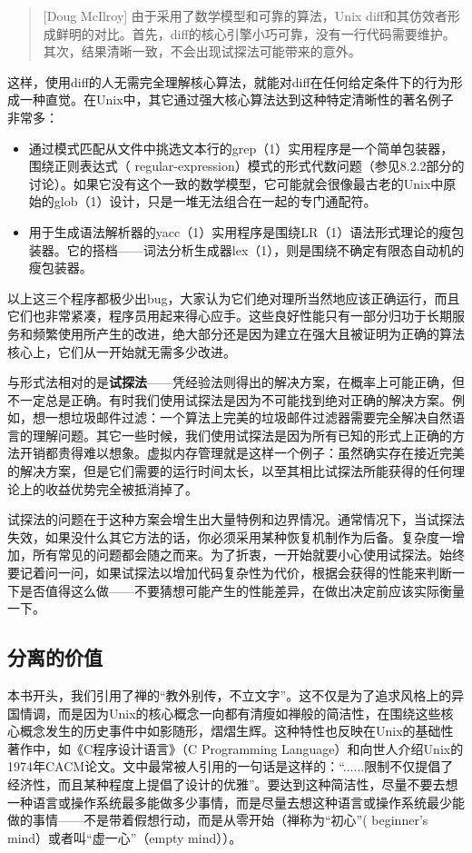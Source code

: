 \documentclass[12pt,oneside]{book}
\begin{document}
\begin{common-format}
\begin{quote}[Doug McIlroy]
由于采用了数学模型和可靠的算法，Unix diff和其仿效者形成鲜明的对比。首先，diff的核心引擎小巧可靠，没有一行代码需要维护。其次，结果清晰一致，不会出现试探法可能带来的意外。
\end{quote}

这样，使用diff的人无需完全理解核心算法，就能对diff在任何给定条件下的行为形成一种直觉。在Unix中，其它通过强大核心算法达到这种特定清晰性的著名例子非常多：

\begin{itemize}
\item 通过模式匹配从文件中挑选文本行的grep（1）实用程序是一个简单包装器，围绕正则表达式（ regular-expression）模式的形式代数问题（参见8.2.2部分的讨论）。如果它没有这个一致的数学模型，它可能就会很像最古老的Unix中原始的glob（1）设计，只是一堆无法组合在一起的专门通配符。
\item 用于生成语法解析器的yacc（1）实用程序是围绕LR（1）语法形式理论的瘦包装器。它的搭档——词法分析生成器lex（1），则是围绕不确定有限态自动机的瘦包装器。
\end{itemize}

以上这三个程序都极少出bug，大家认为它们绝对理所当然地应该正确运行，而且它们也非常紧凑，程序员用起来得心应手。这些良好性能只有一部分归功于长期服务和频繁使用所产生的改进，绝大部分还是因为建立在强大且被证明为正确的算法核心上，它们从一开始就无需多少改进。

与形式法相对的是\textbf{试探法}——凭经验法则得出的解决方案，在概率上可能正确，但不一定总是正确。有时我们使用试探法是因为不可能找到绝对正确的解决方案。例如，想一想垃圾邮件过滤：一个算法上完美的垃圾邮件过滤器需要完全解决自然语言的理解问题。其它一些时候，我们使用试探法是因为所有已知的形式上正确的方法开销都贵得难以想象。虚拟内存管理就是这样一个例子：虽然确实存在接近完美的解决方案，但是它们需要的运行时间太长，以至其相比试探法所能获得的任何理论上的收益优势完全被抵消掉了。

试探法的问题在于这种方案会增生出大量特例和边界情况。通常情况下，当试探法失效，如果没什么其它方法的话，你必须采用某种恢复机制作为后备。复杂度一增加，所有常见的问题都会随之而来。为了折衷，一开始就要小心使用试探法。始终要记着问一问，如果试探法以增加代码复杂性为代价，根据会获得的性能来判断一下是否值得这么做——不要猜想可能产生的性能差异，在做出决定前应该实际衡量一下。

\subsection{分离的价值}
本书开头，我们引用了禅的“教外别传，不立文字”。这不仅是为了追求风格上的异国情调，而是因为Unix的核心概念一向都有清瘦如禅般的简洁性，在围绕这些核心概念发生的历史事件中如影随形，熠熠生辉。这种特性也反映在Unix的基础性著作中，如《C程序设计语言》（C Programming Language）\cite{Kernighan-Ritchie}和向世人介绍Unix的1974年CACM论文。文中最常被人引用的一句话是这样的：“......限制不仅提倡了经济性，而且某种程度上提倡了设计的优雅”。要达到这种简洁性，尽量不要去想一种语言或操作系统最多能做多少事情，而是尽量去想这种语言或操作系统最少能做的事情——不是带着假想行动，而是从零开始（禅称为“初心”( beginner's mind）或者叫“虚一心”（empty mind））。


\end{common-format}
\end{document}
